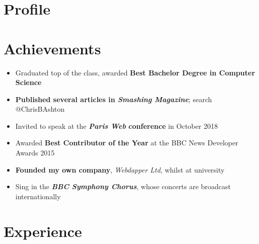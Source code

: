 \documentclass[letterpaper]{twentysecondcv} %
\begin{document}
\makeprofile %

\section{Profile}
\cvsummary

\section{Achievements}
\begin{itemize}
    \item Graduated top of the class, awarded \textbf{Best Bachelor Degree in Computer Science}

    \item \textbf{Published several articles in \emph{Smashing Magazine}}; search @ChrisBAshton

    \item Invited to speak at the \textbf{\emph{Paris Web} conference} in October 2018

    \item Awarded \textbf{Best Contributor of the Year} at the BBC News Developer Awards 2015

    \item \textbf{Founded my own company}, \emph{Webdapper Ltd}, whilst at university

    \item Sing in the \textbf{\emph{BBC Symphony Chorus}}, whose concerts are broadcast internationally
\end{itemize}


\section{Experience}
\end{document}
